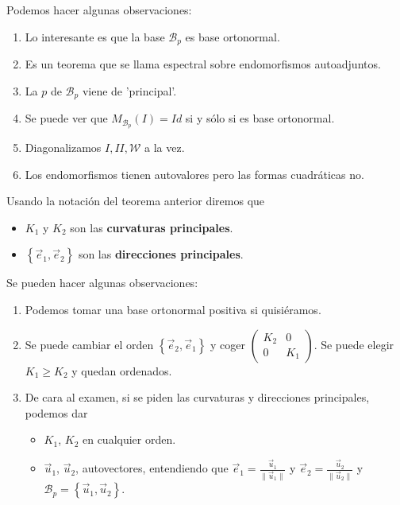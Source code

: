 \begin{observation} Podemos hacer algunas observaciones:
\begin{enumerate}
\item Lo interesante es que la base $\displaystyle \mathcal{B}_{p} $ es base ortonormal. 
\item Es un teorema que se llama espectral sobre endomorfismos autoadjuntos. 
\item La $\displaystyle p $ de $\displaystyle \mathcal{B}_{p} $ viene de 'principal'.
\item Se puede ver que $\displaystyle M_{\mathcal{B}_{p}}\left(I\right)=Id $ si y sólo si es base ortonormal. 
\item Diagonalizamos $\displaystyle I, II, \mathcal{W} $ a la vez.
\item Los endomorfismos tienen autovalores pero las formas cuadráticas no.
\end{enumerate}
\end{observation}
\begin{definition}
Usando la notación del teorema anterior diremos que 
\begin{itemize}
\item $\displaystyle K_{1} $ y $\displaystyle K_{2} $ son las \textbf{curvaturas principales}. 
\item $\displaystyle \left\{ \vec{e}_{1}, \vec{e}_{2}\right\}  $ son las \textbf{direcciones principales}. 
\end{itemize} 
\end{definition}
\begin{observation} Se pueden hacer algunas observaciones: 
	\begin{enumerate}
	\item Podemos tomar una base ortonormal positiva si quisiéramos.
	\item Se puede cambiar el orden $\displaystyle \left\{ \vec{e}_{2}, \vec{e}_{1}\right\}  $ y coger $\displaystyle \begin{pmatrix} K_{2} & 0 \\ 0 & K_{1} \end{pmatrix} $. Se puede elegir $\displaystyle K_{1}\geq K_{2} $ y quedan ordenados. 
	\item De cara al examen, si se piden las curvaturas y direcciones principales, podemos dar 
		\begin{itemize}
		\item $\displaystyle K_{1} $, $\displaystyle K_{2} $ en cualquier orden.
		\item $\displaystyle \vec{u}_{1} $, $\displaystyle \vec{u}_{2} $, autovectores, entendiendo que $\displaystyle \vec{e}_{1}=\frac{\vec{u}_{1}}{\|\vec{u}_{1}\|} $ y $\displaystyle \vec{e}_{2}=\frac{\vec{u}_{2}}{\|\vec{u}_{2}\|} $ y $\displaystyle \mathcal{B}_{p}= \left\{ \vec{u}_{1}, \vec{u}_{2}\right\}  $.
		\end{itemize}
	\end{enumerate}
\end{observation}

